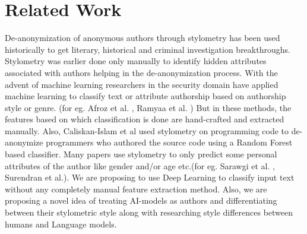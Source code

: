 \documentclass[11pt,letterpaper]{article}
\begin{document}
\section{Related Work}
De-anonymization of anonymous authors through stylometry has been used 
historically to get literary, historical and criminal investigation 
breakthroughs. Stylometry was earlier done only manually to identify 
hidden attributes associated with authors helping in the de-anonymization 
process. With the advent of machine learning researchers in the security 
domain have applied machine learning to classify text or attribute 
authorship based on authorship style or genre. (for eg. Afroz et al. \cite{afroz2014doppelganger}, 
Ramyaa et al. \cite{ramyaa2004using}) But in these methods, the features based on which 
classification is done are hand-crafted and extracted manually. Also, 
Caliskan-Islam et al \cite{caliskan2015anonymizing} used stylometry on programming code to 
de-anonymize programmers who authored the source code using a Random 
Forest based classifier. Many papers use stylometry to only predict 
some personal attributes of the author like gender and/or age etc.(for 
eg. Sarawgi et al. \cite{sarawgi2011gender}, Surendran et al.\cite{surendran2017stylometry}). We are proposing to use 
Deep Learning to classify input text without any completely manual feature 
extraction method. Also, we are proposing a novel idea of treating 
AI-models as authors and differentiating between their stylometric 
style along with researching style differences between humans and 
Language models.
\end{document}

